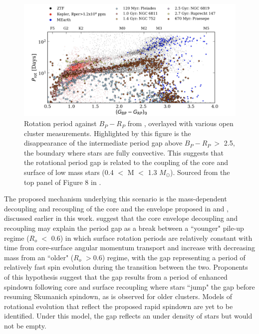 \begin{figure}[h]
    \includegraphics[width=\textwidth]{Figures/intro_figures/ztf_comp.png}
    \caption[Rotation period distribution including fully convective stars.]{Rotation period against \gaia{} $B_P - R_P$ from \kepler{}, \ZTF{} overlayed with various open cluster measurements. Highlighted by this figure is the disappearance of the intermediate period gap above $B_P-R_P \ >$ 2.5, the boundary where stars are fully convective. This suggests that the rotational period gap is related to the coupling of the core and surface of low mass stars (0.4 $<$ M $<$ 1.3 $M_{\odot}$). Sourced from the top panel of Figure 8 in \citet{lu_bridging_2022}.}
    \label{fig:ztf_comp}
\end{figure}

The proposed mechanism underlying this scenario is the mass-dependent decoupling and recoupling of the core and the envelope proposed in 
\citet{lanzafame_rotational_2015} and \citet{spada_competing_2020}, discussed earlier in this work.
\citet{angus_exploring_2020} suggest that the core envelope decoupling and recoupling may explain the period gap as a break between a ``younger" pile-up regime ($R_o$ $<$ 0.6) in which surface rotation periods are relatively constant with time from core-surface angular momentum transport and increase with decreasing mass from an ``older" ($R_o$ $>$0.6) regime, with the gap representing a period of relatively fast spin evolution during the transition between the two.
Proponents of this hypothesis suggest that the gap results from a period of enhanced spindown following core and surface recoupling where stars ``jump" the gap before resuming Skumanich spindown, as is observed for older clusters.
Models of rotational evolution  that reflect the proposed rapid spindown are yet to be identified.
Under this model, the gap reflects an under density of stars but would not be empty.

